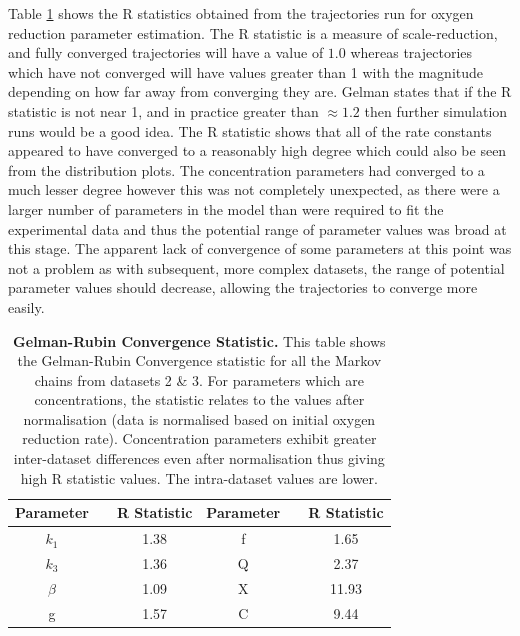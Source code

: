 Table \ref{tab:oxyRstat} shows the R statistics obtained from the trajectories run for oxygen reduction parameter estimation. The R statistic is a measure of scale-reduction, and fully converged trajectories will have a value of $1.0$ whereas trajectories which have not converged will have values greater than 1 with the magnitude depending on how far away from converging they are. Gelman states that if the R statistic is not near 1, and in practice greater than $\approx 1.2$ then further simulation runs would be a good idea\cite{Gilks1996}. The R statistic shows that all of the rate constants appeared to have converged to a reasonably high degree which could also be seen from the distribution plots. The concentration parameters had converged to a much lesser degree however this was not completely unexpected, as there were a larger number of parameters in the model than were required to fit the experimental data and thus the potential range of parameter values was broad at this stage. The apparent lack of convergence of some parameters at this point was not a problem as with subsequent, more complex datasets, the range of potential parameter values should decrease,
allowing the trajectories to converge more easily.
\begin{table}[tbp]%
\renewcommand{\arraystretch}{1.5}
\begin{center}
\begin{tabular}{ccc|ccc}
\toprule
\textbf{Parameter} && \textbf{R Statistic} & \textbf{Parameter} && \textbf{R Statistic}\\
\midrule
$k_1$ && 1.38 & f && 1.65\\
$k_3$ && 1.36 & Q && 2.37\\
$\beta$ && 1.09 & X && 11.93\\
g && 1.57 & C && 9.44\\
\bottomrule
\end{tabular}
\end{center}
\caption[Gelman-Rubin Convergence Statistic]{{\bf Gelman-Rubin Convergence Statistic.} This table shows the Gelman-Rubin Convergence statistic for all the Markov chains from datasets 2 \& 3. For parameters which are concentrations, the statistic relates to the values after normalisation (data is normalised based on initial oxygen reduction rate). Concentration parameters exhibit greater inter-dataset differences even after normalisation thus giving high R statistic values. The intra-dataset values are lower.
\label{tab:oxyRstat}}
\end{table}

